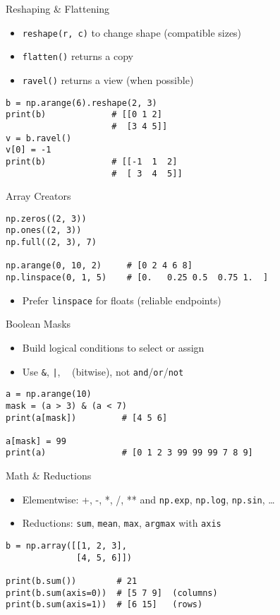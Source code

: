 \documentclass{beamer}
\begin{document}
\begin{frame}[fragile]{Reshaping \& Flattening}
\begin{itemize}
  \item \texttt{reshape(r, c)} to change shape (compatible sizes)
  \item \texttt{flatten()} returns a copy
  \item \texttt{ravel()} returns a view (when possible)
\end{itemize}
\begin{verbatim}
b = np.arange(6).reshape(2, 3)
print(b)             # [[0 1 2]
                     #  [3 4 5]]
v = b.ravel()
v[0] = -1
print(b)             # [[-1  1  2]
                     #  [ 3  4  5]]
\end{verbatim}
\end{frame}

\begin{frame}[fragile]{Array Creators}
\begin{verbatim}
np.zeros((2, 3))
np.ones((2, 3))
np.full((2, 3), 7)

np.arange(0, 10, 2)     # [0 2 4 6 8]
np.linspace(0, 1, 5)    # [0.   0.25 0.5  0.75 1.  ]
\end{verbatim}
\begin{itemize}
  \item Prefer \texttt{linspace} for floats (reliable endpoints)
\end{itemize}
\end{frame}

\begin{frame}[fragile]{Boolean Masks}
\begin{itemize}
  \item Build logical conditions to select or assign
  \item Use \texttt{\&}, \texttt{|}, \texttt{\string~} (bitwise), not \texttt{and}/\texttt{or}/\texttt{not}
\end{itemize}
\begin{verbatim}
a = np.arange(10)
mask = (a > 3) & (a < 7)
print(a[mask])         # [4 5 6]

a[mask] = 99
print(a)               # [0 1 2 3 99 99 99 7 8 9]
\end{verbatim}
\end{frame}

\begin{frame}[fragile]{Math \& Reductions}
\begin{itemize}
  \item Elementwise: +, -, *, /, ** and \texttt{np.exp}, \texttt{np.log}, \texttt{np.sin}, \dots
  \item Reductions: \texttt{sum}, \texttt{mean}, \texttt{max}, \texttt{argmax} with \texttt{axis}
\end{itemize}
\begin{verbatim}
b = np.array([[1, 2, 3],
              [4, 5, 6]])

print(b.sum())        # 21
print(b.sum(axis=0))  # [5 7 9]  (columns)
print(b.sum(axis=1))  # [6 15]   (rows)
\end{verbatim}
\end{frame}
\end{document}
